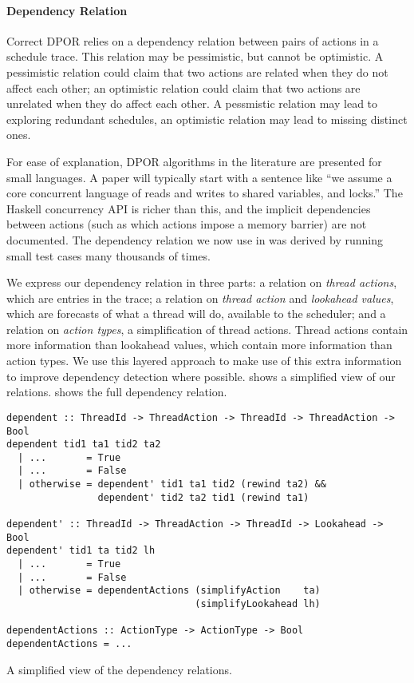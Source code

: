 \paragraph{Dependency Relation}
Correct DPOR relies on a dependency relation between pairs of actions
in a schedule trace.  This relation may be pessimistic, but cannot be
optimistic.  A pessimistic relation could claim that two actions are
related when they do not affect each other; an optimistic relation
could claim that two actions are unrelated when they do affect each
other.  A pessmistic relation may lead to exploring redundant
schedules, an optimistic relation may lead to missing distinct ones.

For ease of explanation, DPOR algorithms in the literature are
presented for small languages.  A paper will typically start with a
sentence like ``we assume a core concurrent language of reads and
writes to shared variables, and locks.''  The Haskell concurrency API
is richer than this, and the implicit dependencies between actions
(such as which actions impose a memory barrier) are not documented.
The dependency relation we now use in \dejafu{} was derived by running
small test cases many thousands of times.

We express our dependency relation in three parts: a relation on
\emph{thread actions}, which are entries in the trace; a relation on
\emph{thread action} and \emph{lookahead values}, which are forecasts
of what a thread will do, available to the scheduler; and a relation
on \emph{action types}, a simplification of thread actions.  Thread
actions contain more information than lookahead values, which contain
more information than action types.  We use this layered approach to
make use of this extra information to improve dependency detection
where possible.   shows a simplified view of our
relations.   shows the full dependency relation.

\begin{listing}
  \begin{verbatim}
dependent :: ThreadId -> ThreadAction -> ThreadId -> ThreadAction -> Bool
dependent tid1 ta1 tid2 ta2
  | ...       = True
  | ...       = False
  | otherwise = dependent' tid1 ta1 tid2 (rewind ta2) &&
                dependent' tid2 ta2 tid1 (rewind ta1)

dependent' :: ThreadId -> ThreadAction -> ThreadId -> Lookahead -> Bool
dependent' tid1 ta tid2 lh
  | ...       = True
  | ...       = False
  | otherwise = dependentActions (simplifyAction    ta)
                                 (simplifyLookahead lh)

dependentActions :: ActionType -> ActionType -> Bool
dependentActions = ...
  \end{verbatim}
  \caption{A simplified view of the \dejafu{} dependency relations.}\label{lst:deprel-simp}
\end{listing}

